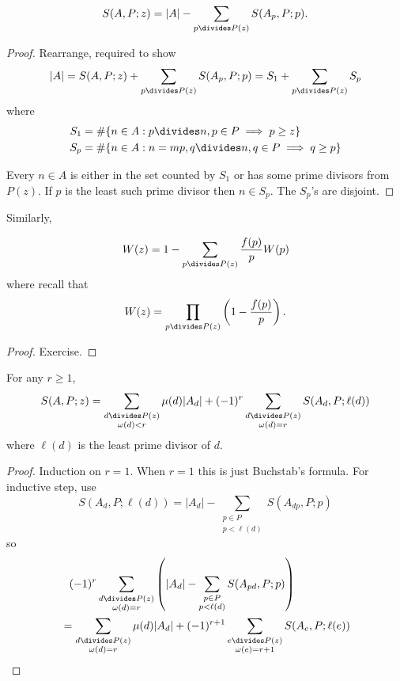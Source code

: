 \documentclass[a4paper]{article}
\theoremstyle{definition}
\begin{document}
\begin{lemma}
  \[
    S(A, P; z) = |A| - \sum_{p \divides P(z)} S(A_p, P; p).
  \]
\end{lemma}

\begin{proof}
  Rearrange, required to show
  \[
    |A|
    = S(A, P; z) + \sum_{p \divides P(z)} S(A_p, P; p)
    = S_1 + \sum_{p \divides P(z)} S_p
  \]
  where
  \begin{align*}
    S_1 &= \#\{n \in A: p \divides n, p \in P \implies p \geq z\} \\
    S_p &= \#\{n \in A: n = mp, q \divides n, q \in P \implies q \geq p\}
  \end{align*}

  Every \(n \in A\) is either in the set counted by \(S_1\) or has some prime divisors from \(P(z)\). If \(p\) is the least such prime divisor then \(n \in S_p\). The \(S_p\)'s are disjoint.
\end{proof}

Similarly,

\begin{lemma}
 \[
   W(z) = 1 - \sum_{p \divides P(z)} \frac{f(p)}{p} W(p)
 \]
 where recall that
 \[
   W(z) = \prod_{p \divides P(z)} \left( 1 - \frac{f(p)}{p} \right).
 \]
\end{lemma}

\begin{proof}
  Exercise.
\end{proof}

\begin{corollary}
  For any \(r \geq 1\),
  \[
    S(A, P; z) = \sum_{\substack{d \divides P(z) \\ \omega(d) < r}} \mu(d) |A_d| + (-1)^r \sum_{\substack{d \divides P(z) \\ \omega(d) = r}} S(A_d, P; \ell(d))
  \]
  where \(\ell(d)\) is the least prime divisor of \(d\).
\end{corollary}

\begin{proof}
  Induction on \(r = 1\). When \(r = 1\) this is just Buchstab's formula. For inductive step, use
  \[
    S(A_d, P; \ell(d))
    = |A_d| - \sum_{\substack{p \in P \\ p < \ell(d)}} S(A_{dp}, P; p)
  \]
  so
  \begin{align*}
    &\phantom{= } (-1)^r \sum_{\substack{d \divides P(z) \\\omega(d) = r}} \left( |A_d| - \sum_{\substack{p \in P \\ p < \ell(d)}} S(A_{pd}, P; p) \right) \\
    &= \sum_{\substack{d \divides P(z) \\ \omega(d) = r}} \mu(d) |A_d| + (-1)^{r + 1} \sum_{\substack{e \divides P(z) \\ \omega(e) = r + 1}} S(A_e, P; \ell(e))
  \end{align*}
\end{proof}
\end{document}
